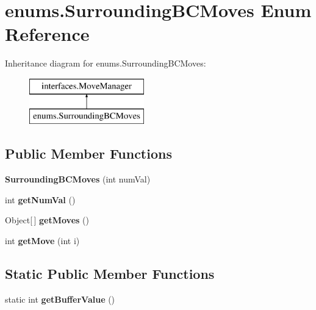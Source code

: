 \hypertarget{enumenums_1_1_surrounding_b_c_moves}{\section{enums.\-Surrounding\-B\-C\-Moves Enum Reference}
\label{enumenums_1_1_surrounding_b_c_moves}
}
Inheritance diagram for enums.\-Surrounding\-B\-C\-Moves\-:\begin{figure}[H]
\begin{center}
\leavevmode
\includegraphics[height=2.000000cm]{enumenums_1_1_surrounding_b_c_moves}
\end{center}
\end{figure}
\subsection*{Public Member Functions}
\begin{DoxyCompactItemize}
\item 
\hypertarget{enumenums_1_1_surrounding_b_c_moves_ad1e75538ae06c608b57c427ce646ad81}{{\bfseries Surrounding\-B\-C\-Moves} (int num\-Val)}\label{enumenums_1_1_surrounding_b_c_moves_ad1e75538ae06c608b57c427ce646ad81}

\item 
\hypertarget{enumenums_1_1_surrounding_b_c_moves_a365d87641914ca5a54027f460475797a}{int {\bfseries get\-Num\-Val} ()}\label{enumenums_1_1_surrounding_b_c_moves_a365d87641914ca5a54027f460475797a}

\item 
\hypertarget{enumenums_1_1_surrounding_b_c_moves_a464ca6e0c16e646d97f1568be6b7d4be}{Object\mbox{[}$\,$\mbox{]} {\bfseries get\-Moves} ()}\label{enumenums_1_1_surrounding_b_c_moves_a464ca6e0c16e646d97f1568be6b7d4be}

\item 
\hypertarget{enumenums_1_1_surrounding_b_c_moves_ab8e3b569c6dc90a1510d40de948d7b7d}{int {\bfseries get\-Move} (int i)}\label{enumenums_1_1_surrounding_b_c_moves_ab8e3b569c6dc90a1510d40de948d7b7d}

\end{DoxyCompactItemize}
\subsection*{Static Public Member Functions}
\begin{DoxyCompactItemize}
\item 
\hypertarget{enumenums_1_1_surrounding_b_c_moves_a353e41b0ed23957aa03a1c00f5a3c3ff}{static int {\bfseries get\-Buffer\-Value} ()}\label{enumenums_1_1_surrounding_b_c_moves_a353e41b0ed23957aa03a1c00f5a3c3ff}

\end{DoxyCompactItemize}
